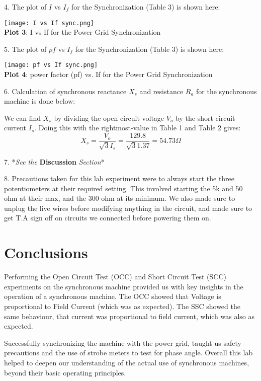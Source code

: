 \documentclass[]{report}
\begin{document}
4. The plot of $I$ vs $I_f$ for the Synchronization (Table 3) is shown here:

\begin{center}
	\centering
	\texttt{[image: I vs If sync.png]} \\
	\textbf{Plot 3}: I vs If for the Power Grid Synchronization
\end{center}

5. The plot of $pf$ vs $I_f$ for the Synchronization (Table 3) is shown here:

\begin{center}
	\centering
	\texttt{[image: pf vs If sync.png]} \\
	\textbf{Plot 4}: power factor (pf) vs. If for the Power Grid Synchronization
\end{center}

6. Calculation of synchronous reactance $X_s$ and resistance $R_a$ for the synchronous machine is done below:

We can find $X_s$ by dividing the open circuit voltage $V_o$ by the short circuit current $I_s$. Doing this with the rightmost-value in Table 1 and Table 2 gives:
	\[ X_s = \frac{V_o}{\sqrt{3}I_s} = \frac{129.8}{\sqrt{3}1.37} = 54.73 \Omega	\]

7. *\textit{See the} \textbf{Discussion} \textit{Section}*

8. Precautions taken for this lab experiment were to always start the three potentiometers at their required setting. This involved starting the 5k and 50 ohm at their max, and the 300 ohm at its minimum. We also made sure to unplug the live wires before modifying anything in the circuit, and made sure to get T.A sign off on circuits we connected before powering them on.

\section*{Conclusions}

Performing the Open Circuit Test (OCC) and Short Circuit Test (SCC) experiments on the synchronous machine provided us with key insights in the operation of a synchronous machine. The OCC showed that Voltage is proportional to Field Current (which was as expected). The SSC showed the same behaviour, that current was proportional to field current, which was also as expected.

Successfully synchronizing the machine with the power grid, taught us safety precautions and the use of strobe meters to test for phase angle. Overall this lab helped to deepen our understanding of the actual use of synchronous machines, beyond their basic operating principles.
\end{document}
